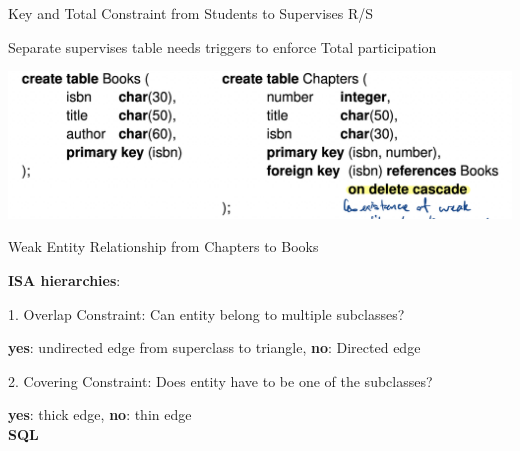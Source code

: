 \documentclass[10pt, a4paper]{article}
\newcommand{\header}[1]{{\normalsize\textbf{#1}}}
\newcommand{\tab}[0]{\hspace*{2mm}}
\begin{document}
\begin{multicols*}{3}
		Key and Total Constraint from Students to Supervises R/S

		Separate supervises table needs triggers to enforce Total participation

		\includegraphics[scale=0.23]{./assets/weakEntity.png}

		Weak Entity Relationship from Chapters to Books

		\textbf{ISA hierarchies}:

		1. Overlap Constraint: Can entity belong to multiple subclasses?

		\tab \textbf{yes}: undirected edge from superclass to triangle, \textbf{no}: Directed edge

		2. Covering Constraint: Does entity have to be one of the subclasses?

		\tab \textbf{yes}: thick edge, \textbf{no}: thin edge\\

		\header{SQL}











\end{multicols*}
\end{document}
